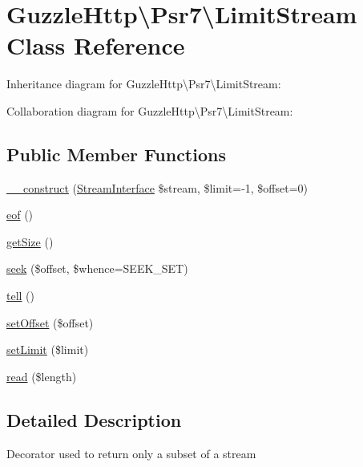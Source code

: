 \hypertarget{classGuzzleHttp_1_1Psr7_1_1LimitStream}{}\section{Guzzle\+Http\textbackslash{}Psr7\textbackslash{}Limit\+Stream Class Reference}
\label{classGuzzleHttp_1_1Psr7_1_1LimitStream}


Inheritance diagram for Guzzle\+Http\textbackslash{}Psr7\textbackslash{}Limit\+Stream\+:


Collaboration diagram for Guzzle\+Http\textbackslash{}Psr7\textbackslash{}Limit\+Stream\+:
\subsection*{Public Member Functions}
\begin{DoxyCompactItemize}
\item 
\hyperlink{classGuzzleHttp_1_1Psr7_1_1LimitStream_aebf683e9d09627f9fde7192892db61e1}{\+\_\+\+\_\+construct} (\hyperlink{interfacePsr_1_1Http_1_1Message_1_1StreamInterface}{Stream\+Interface} \$stream, \$limit=-\/1, \$offset=0)
\item 
\hyperlink{classGuzzleHttp_1_1Psr7_1_1LimitStream_a88b0131f6bccc09e6dc02800fe558505}{eof} ()
\item 
\hyperlink{classGuzzleHttp_1_1Psr7_1_1LimitStream_acdd9a4c2b17bfe31bb238fea5240cb5a}{get\+Size} ()
\item 
\hyperlink{classGuzzleHttp_1_1Psr7_1_1LimitStream_aa1230441e4a3ce17b63330b43f2b038b}{seek} (\$offset, \$whence=S\+E\+E\+K\+\_\+\+S\+ET)
\item 
\hyperlink{classGuzzleHttp_1_1Psr7_1_1LimitStream_a7f3f1d99ade05ec436b34d32886defdf}{tell} ()
\item 
\hyperlink{classGuzzleHttp_1_1Psr7_1_1LimitStream_a87c2f541e104b649886d56666744cbe5}{set\+Offset} (\$offset)
\item 
\hyperlink{classGuzzleHttp_1_1Psr7_1_1LimitStream_ac554a6697ae5de8fd2bd0c6173f5d88b}{set\+Limit} (\$limit)
\item 
\hyperlink{classGuzzleHttp_1_1Psr7_1_1LimitStream_a5c6d3611a68073edd5927d82296d272f}{read} (\$length)
\end{DoxyCompactItemize}


\subsection{Detailed Description}
Decorator used to return only a subset of a stream 

